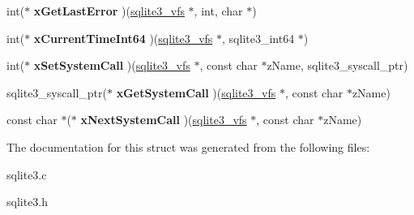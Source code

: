 \begin{DoxyCompactItemize}
\item 
int($\ast$ {\bfseries x\+Get\+Last\+Error} )(\hyperlink{structsqlite3__vfs}{sqlite3\+\_\+vfs} $\ast$, int, char $\ast$)\hypertarget{structsqlite3__vfs_a4994110c79d082f7770ce553d507748f}{}\label{structsqlite3__vfs_a4994110c79d082f7770ce553d507748f}

\item 
int($\ast$ {\bfseries x\+Current\+Time\+Int64} )(\hyperlink{structsqlite3__vfs}{sqlite3\+\_\+vfs} $\ast$, sqlite3\+\_\+int64 $\ast$)\hypertarget{structsqlite3__vfs_aa281584c422969b7f0df0e5f918fc590}{}\label{structsqlite3__vfs_aa281584c422969b7f0df0e5f918fc590}

\item 
int($\ast$ {\bfseries x\+Set\+System\+Call} )(\hyperlink{structsqlite3__vfs}{sqlite3\+\_\+vfs} $\ast$, const char $\ast$z\+Name, sqlite3\+\_\+syscall\+\_\+ptr)\hypertarget{structsqlite3__vfs_a69996d40229d6eabe6869bb3fc80b730}{}\label{structsqlite3__vfs_a69996d40229d6eabe6869bb3fc80b730}

\item 
sqlite3\+\_\+syscall\+\_\+ptr($\ast$ {\bfseries x\+Get\+System\+Call} )(\hyperlink{structsqlite3__vfs}{sqlite3\+\_\+vfs} $\ast$, const char $\ast$z\+Name)\hypertarget{structsqlite3__vfs_a604384e58c645e06b6db38d8a45e1103}{}\label{structsqlite3__vfs_a604384e58c645e06b6db38d8a45e1103}

\item 
const char $\ast$($\ast$ {\bfseries x\+Next\+System\+Call} )(\hyperlink{structsqlite3__vfs}{sqlite3\+\_\+vfs} $\ast$, const char $\ast$z\+Name)\hypertarget{structsqlite3__vfs_ac2930d34749977f39b1bbc27dc1de2b2}{}\label{structsqlite3__vfs_ac2930d34749977f39b1bbc27dc1de2b2}

\end{DoxyCompactItemize}


The documentation for this struct was generated from the following files\+:\begin{DoxyCompactItemize}
\item 
sqlite3.\+c\item 
sqlite3.\+h\end{DoxyCompactItemize}
